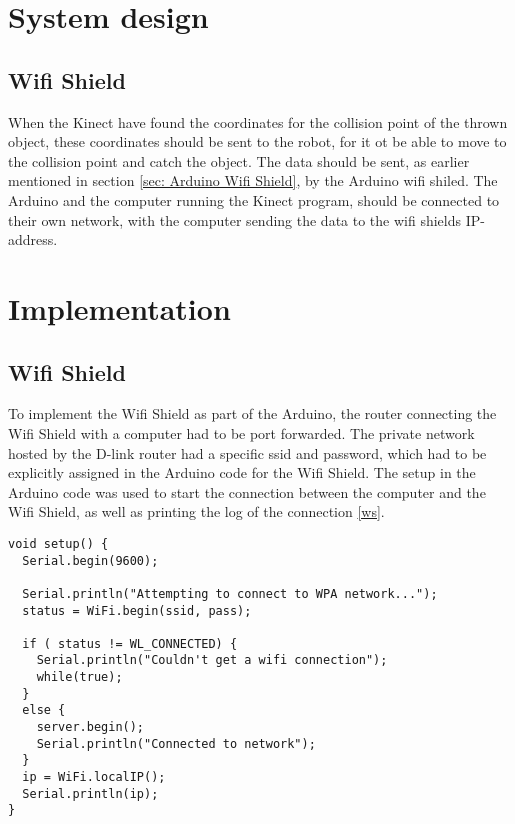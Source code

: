 \section{System design}
\label{sec:i2System design}

\subsection{Wifi Shield}
\label{sec:Wifi Shield SD}
When the Kinect have found the coordinates for the collision point of the thrown object, these coordinates should be sent to the robot, for it ot be able to move to the collision point and catch the object. 
The data should be sent, as earlier mentioned in section \ref{sec: Arduino Wifi Shield}, by the Arduino wifi shiled. The Arduino and the computer running the Kinect program, should be connected to their own network, with the computer sending the data to the wifi shields IP-address.

\section{Implementation}
\label{sec:i2Implementation}

\subsection{Wifi Shield}
\label{sec:Wifi Shield Implementation}
To implement the Wifi Shield as part of the Arduino, the router connecting the Wifi Shield with a computer had to be port forwarded. The private network hosted by the D-link router had a specific ssid and password, which had to be explicitly assigned in the Arduino code for the Wifi Shield. The setup in the Arduino code was used to start the connection between the computer and the Wifi Shield, as well as printing the log of the connection \ref{ws}.

\begin{lstlisting}[caption={Connecting the Wifi shield to the network}, label={ws}]
void setup() {
  Serial.begin(9600);

  Serial.println("Attempting to connect to WPA network...");
  status = WiFi.begin(ssid, pass);

  if ( status != WL_CONNECTED) { 
    Serial.println("Couldn't get a wifi connection");
    while(true);
  } 
  else {
    server.begin();
    Serial.println("Connected to network");
  }
  ip = WiFi.localIP();
  Serial.println(ip);
}
\end{lstlisting}

